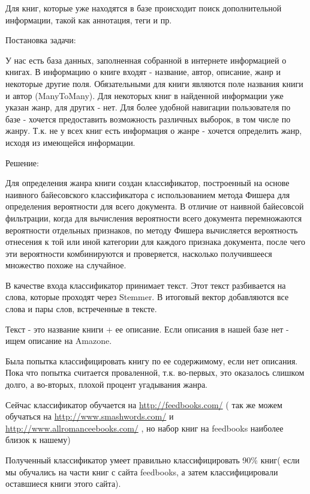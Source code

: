 \documentclass[a4paper]{report}
\begin{document}
Для книг, которые уже находятся в базе происходит поиск дополнительной информации, такой как аннотация, теги и пр.


Постановка задачи:

У нас есть база данных, заполненная собранной в интернете информацией о книгах. В информацию о книге входят - название, автор, описание, жанр и некоторые другие поля. Обязательными для книги являются поле названия книги и автор (ManyToMany). Для некоторых книг в найденной информации уже указан жанр, для других - нет. Для более удобной навигации пользователя по базе - хочется предоставить возможность различных выборок, в том числе по жанру. Т.к. не у всех книг есть информация о жанре - хочется определить жанр, исходя из имеющейся информации. 

Решение:

Для определения жанра книги создан классификатор, построенный на основе наивного байесовского классификатора с использованием метода Фишера для определения вероятности для всего документа. В отличие от наивной байесовсой фильтрации, когда для вычисления вероятности всего документа перемножаются вероятности отдельных признаков, по методу Фишера вычисляется вероятность отнесения к той или иной категории для каждого признака документа, после чего эти вероятности комбинируются и проверяется, насколько получившееся множество похоже на случайное.

В качестве входа классификатор принимает текст. Этот текст разбивается на слова, которые проходят через Stemmer. В итоговый вектор добавляются все слова и пары слов, встреченные в тексте.

Текст - это название книги + ее описание. Если описания в нашей базе нет - ищем описание на Amazone.

Была попытка классифицировать книгу по ее содержимому, если нет описания. Пока что попытка считается проваленной, т.к. во-первых, это оказалось слишком долго, а во-вторых, плохой процент угадывания жанра.

Сейчас классификатор обучается на \url{http://feedbooks.com/} ( так же можем обучаться на \url{http://www.smashwords.com/} и \url{http://www.allromanceebooks.com/} , но набор книг на feedbooks наиболее близок к нашему)

Полученный классификатор умеет правильно классифицировать 90\% книг( если мы обучались на части книг с сайта feedbooks, а затем классифицировали оставшиеся книги этого сайта). 
\end{document}
